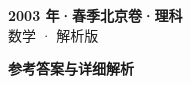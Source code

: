 \documentclass[zihao=-4, a4paper]{ctexart}
\begin{document}
\begin{center}
  {\Large\bfseries 2003 年·春季北京卷·理科}\\[4pt]
  {\large 数学 · 解析版}
\end{center}
\medskip
{}

\clearpage
{}
\begin{center}{\Large\bfseries 参考答案与详细解析}\end{center}
\medskip

\end{document}
